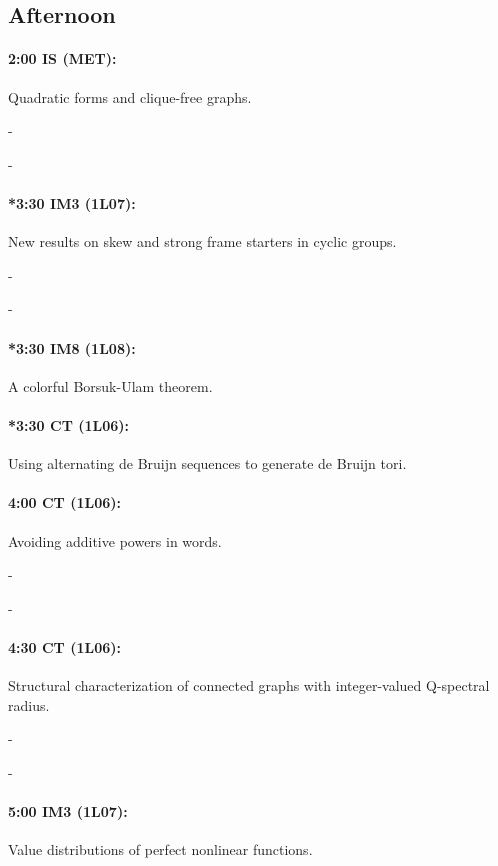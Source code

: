 \documentclass[12]{article}
\theoremstyle{definition}
\begin{document}
	
	\newpage
	\subsection{Afternoon}
	
	\paragraph{2:00 IS (MET):} Quadratic forms and clique-free graphs.
	
	-
	
	-
	
	\paragraph{*3:30 IM3 (1L07):} New results on skew and strong frame starters in cyclic groups.
	
	-
	
	-
	
	\paragraph{*3:30 IM8 (1L08):} A colorful Borsuk-Ulam theorem.
	
	\paragraph{*3:30 CT (1L06):} Using alternating de Bruijn sequences to generate de Bruijn tori.
	
	\paragraph{4:00 CT (1L06):} Avoiding additive powers in words.
	
	-
	
	-
	
	\paragraph{4:30 CT (1L06):} Structural characterization of connected graphs with integer-valued Q-spectral radius.
	
	-
	
	-
	
	\paragraph{5:00 IM3 (1L07):} Value distributions of perfect nonlinear functions.
	
\end{document}
